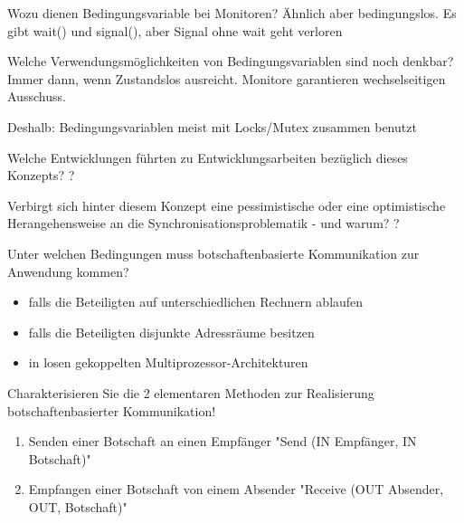 \documentclass[avery5371]{flashcards}
\begin{document}
\begin{flashcard}{Wozu dienen Bedingungsvariable bei Monitoren? }
    Ähnlich aber bedingungslos. Es gibt wait() und signal(), aber Signal ohne wait geht verloren
\end{flashcard}

\begin{flashcard}{Welche Verwendungsmöglichkeiten von Bedingungsvariablen sind noch denkbar?}
    Immer dann, wenn Zustandslos ausreicht. Monitore garantieren wechselseitigen Ausschuss.

    Deshalb: Bedingungsvariablen meist mit Locks/Mutex zusammen benutzt
\end{flashcard}

\begin{flashcard}{Welche Entwicklungen führten zu Entwicklungsarbeiten bezüglich dieses Konzepts?}
    ?
\end{flashcard}

\begin{flashcard}{Verbirgt sich hinter diesem Konzept eine pessimistische oder eine optimistische Herangehensweise an die Synchronisationsproblematik - und warum?}
    ?
\end{flashcard}

\begin{flashcard}{Unter welchen Bedingungen muss botschaftenbasierte Kommunikation zur Anwendung kommen?}
    \begin{itemize}
        \item falls die Beteiligten auf unterschiedlichen Rechnern ablaufen
        \item falls die Beteiligten disjunkte Adressräume besitzen
        \item in losen gekoppelten Multiprozessor-Architekturen
    \end{itemize}
\end{flashcard}

\begin{flashcard}{Charakterisieren Sie die 2 elementaren Methoden zur Realisierung botschaftenbasierter Kommunikation!}
    \begin{enumerate}
        \item Senden einer Botschaft an einen Empfänger "Send (IN Empfänger, IN Botschaft)"
        \item Empfangen einer Botschaft von einem Absender "Receive (OUT Absender, OUT, Botschaft)"
    \end{enumerate}
\end{flashcard}
\end{document}
